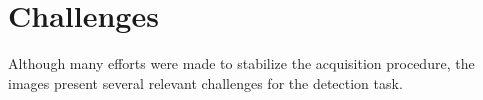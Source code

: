 \section{Challenges}
\label{sec:challenges}





Although many efforts were made to stabilize the acquisition procedure, the images present several relevant challenges for the detection task.



